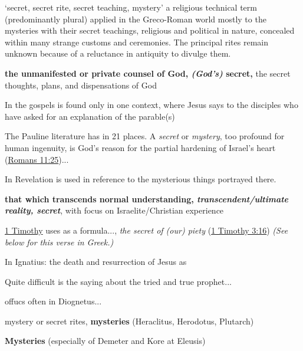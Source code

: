 				\begin{compactdesc}
					\item[BDAG 586b] `secret, secret rite, secret teaching, mystery' a religious technical term (predominantly plural) applied in the Greco-Roman world mostly to the mysteries with their secret teachings, religious and political in nature, concealed within many strange customs and ceremonies. The principal rites remain unknown because of a reluctance in antiquity to divulge them.
						\begin{compactitem}
							\item[1] \textbf{the unmanifested or private counsel of God, \textit{(God's)} secret,} the secret thoughts, plans, and dispensations of God
							\item[1a] In the gospels  is found only in one context, where Jesus says to the disciples who have asked for an explanation of the parable(s)
							\item[1b] The Pauline literature has  in 21 places. A \textit{secret} or \textit{mystery}, too profound for human ingenuity, is God's reason for the partial hardening of Israel's heart (\hyperref[ROMANS-11-25]{Romans 11:25})...
							\item[1c] In Revelation  is used in reference to the mysterious things portrayed there.
							\item[2] \textbf{that which transcends normal understanding, \textit{transcendent/ultimate reality, secret}}, with focus on Israelite/Christian experience
							\item[2a] \hyperref[1TIMOTHY]{1 Timothy} uses  as a formula..., \textit{the secret of (our) piety} (\hyperref[1TIMOTHY-3-16]{1 Timothy 3:16}) \textit{(See below for this verse in Greek.)}
							\item[2b] In Ignatius: the death and resurrection of Jesus as 
							\item[2c] Quite difficult is the saying about the tried and true prophet...
							\item[2d]  offucs often in Diognetus...
						\end{compactitem}
					\item[CGL 953a, PDF 993] \textbf{}
						\begin{compactitem}
							\item[1] mystery or secret rites, \textbf{mysteries} (Heraclitus, Herodotus, Plutarch)
							\item[2] \textbf{Mysteries} (especially of Demeter and Kore at Eleusis)

\end{compactitem}
\end{compactdesc}
